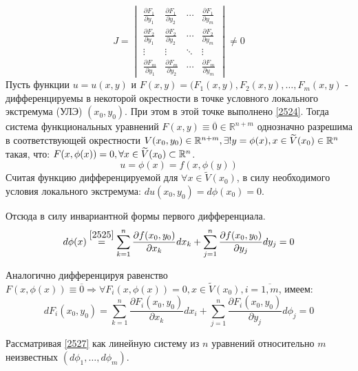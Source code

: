 \begin{equation}
\label{2524}
J =  \begin{vmatrix}
\frac{\partial F_1}{\partial y_1} & \frac{\partial F_1}{\partial y_2} & \cdots & \frac{\partial F_1}{\partial y_m} \\
\frac{\partial F_2}{\partial y_1} & \frac{\partial F_2}{\partial y_2} & \cdots & \frac{\partial F_2}{\partial y_m} \\
\vdots  & \vdots  & \ddots & \vdots  \\
\frac{\partial F_m}{\partial y_1} & \frac{\partial F_m}{\partial y_2} & \cdots & \frac{\partial F_m}{\partial y_m}
\end{vmatrix} \ne 0
\end{equation}
Пусть функции $u = u(x,y)$ и $F(x,y) = (F_1 (x,y), F_2(x,y), \ldots, F_m(x,y)$ - дифференцируемы в некоторой окрестности в точке условного локального экстремума (УЛЭ) $(x_0, y_0)$. При этом в этой точке выполнено \eqref{2524}. Тогда система функциональных уравнений $F(x,y) \equiv \overline{0} \in \mathbb{R}^{n+m}$ однозначно разрешима в соответствующей окрестности $V(x_0, y_0) \in \mathbb{R}^{n+m}, \exists ! y = \phi(x), x \in \widetilde{V} (x_0) \in \mathbb{R}^n$ такая, что: $F(x, \phi(x)) = 0, \forall x \in \widetilde{V}(x_0) \subset \mathbb{R}^n$.
\begin{equation}
\label{2525}
u = \phi(x) = f(x, \phi(y))
\end{equation}
Считая функцию дифференцируемой для $\forall x \in \widetilde{V}(x_0)$, в силу необходимого условия локального экстремума: $du(x_0, y_0) = d \phi (x_0) = 0$.

Отсюда в силу инвариантной формы первого дифференциала.
\begin{equation}
\label{2526}
d \phi(x) \overset{\eqref{2525}}{=} \sum\limits_{k=1}^{n} \dfrac{\partial f(x_0, y_0)}{\partial x_k} d x_k + \sum\limits_{j=1}^{n} \dfrac{\partial f(x_0, y_0)}{\partial y_j} d y_j = 0
\end{equation}

Аналогично дифференцируя равенство $F (x, \phi(x)) \equiv \overline{0} \Rightarrow \forall F_i(x, \phi(x)) = 0, x \in \widetilde{V}(x_0), i = \overline{1, m}$, имеем:
\begin{equation}
\label{2527}
d F_i (x_0, y_0) = \sum\limits_{k=1}^{n} \dfrac{\partial F_i (x_0, y_0)}{\partial x_k} d x_i + \sum\limits_{j=1}^{n} \dfrac{\partial F_i (x_0, y_0)}{\partial y_j} d \phi_j = 0
\end{equation}

Рассматривая \eqref{2527} как линейную систему из $n$ уравнений относительно $m$ неизвестных $(d \phi_1, \ldots, d \phi_m)$.


